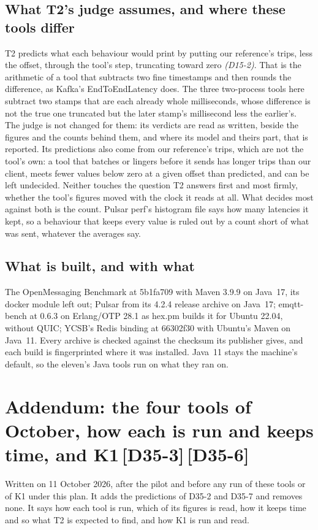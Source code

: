 \documentclass[11pt]{article}
\newcommand{\gl}[1]{{\color{soft}\itshape\small (#1)}}
\newcommand{\chgold}[1]{\,{\color{oldcol}\bfseries\footnotesize[#1]}}
\begin{document}
\subsection*{What T2's judge assumes, and where these tools differ}
T2 predicts what each behaviour would print by putting our reference's trips, less the offset,
through the tool's step, truncating toward zero \gl{D15-2}. That is the arithmetic of a tool that
subtracts two fine timestamps and then rounds the difference, as Kafka's EndToEndLatency does. The
three two-process tools here subtract two stamps that are each already whole milliseconds, whose
difference is not the true one truncated but the later stamp's millisecond less the earlier's. The
judge is not changed for them: its verdicts are read as written, beside the figures and the counts
behind them, and where its model and theirs part, that is reported. Its predictions also come from
our reference's trips, which are not the tool's own: a tool that batches or lingers before it sends
has longer trips than our client, meets fewer values below zero at a given offset than predicted,
and can be left undecided. Neither touches the question T2 answers first and most firmly, whether
the tool's figures moved with the clock it reads at all. What decides most against both is the
count. Pulsar perf's histogram file says how many latencies it kept, so a behaviour that keeps
every value is ruled out by a count short of what was sent, whatever the averages say.

\subsection*{What is built, and with what}
The OpenMessaging Benchmark at 5b1fa709 with Maven 3.9.9 on Java~17, its docker module left
out; Pulsar from its 4.2.4 release archive on Java~17; emqtt-bench at 0.6.3 on Erlang/OTP 28.1 as
hex.pm builds it for Ubuntu 22.04, without QUIC; YCSB's Redis binding at 66302f30 with Ubuntu's
Maven on Java~11. Every archive is checked against the checksum its publisher gives, and each
build is fingerprinted where it was installed. Java~11 stays the machine's default, so the eleven's
Java tools run on what they ran on.

\section[Addendum: the four tools of October, and K1]{Addendum: the four tools of October, how each is run and keeps time, and K1\protect\chgold{D35-3}\protect\chgold{D35-6}}\label{sec:addendum-four}
Written on 11 October 2026, after the pilot and before any run of these tools or of K1 under
this plan. It adds the predictions of D35-2 and D35-7 and removes none. It says how each tool is
run, which of its figures is read, how it keeps time and so what T2 is expected to find, and how
K1 is run and read.
\end{document}
